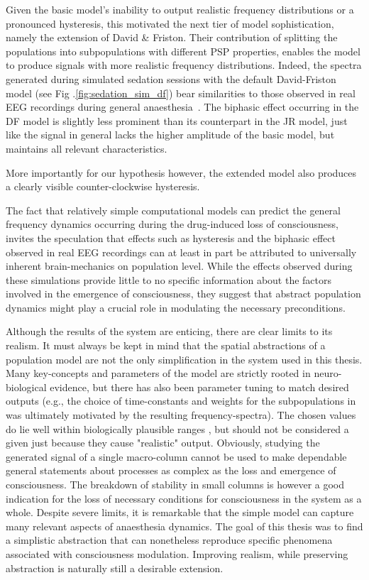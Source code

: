 Given the basic model's inability to output realistic frequency distributions or a pronounced hysteresis,
this motivated the next tier of model sophistication, namely the extension of David \&
Friston\cite{david_neural_2003}.
Their contribution of splitting the populations into subpopulations with different PSP properties,
enables the model to produce signals with more realistic frequency distributions.
Indeed, the spectra generated during simulated sedation sessions with the default David-Friston model
(see Fig .\ref{fig:sedation_sim_df}) bear similarities to those observed in
real EEG recordings during general anaesthesia~\cite{purdon_electroencephalogram_2013}.
The biphasic effect occurring in the DF model is slightly less prominent than its counterpart in the JR model,
just like the signal in general lacks the higher amplitude of the basic model,
but maintains all relevant characteristics.

More importantly for our hypothesis however,
the extended model also produces a clearly visible counter-clockwise hysteresis.

The fact that relatively simple computational models can predict the general frequency dynamics occurring during the
drug-induced loss of consciousness,
invites the speculation that effects such as hysteresis and the biphasic effect observed in real EEG recordings can at
least in part be attributed to universally inherent brain-mechanics on population level.
While the effects observed during these simulations provide little to no specific information about the factors
involved in the emergence of consciousness,
they suggest that abstract population dynamics might play a crucial role in modulating the necessary preconditions.

Although the results of the system are enticing,
there are clear limits to its realism.
It must always be kept in mind that the spatial abstractions of a
population model are not the only simplification in the system used in this thesis.
Many key-concepts and parameters of the model are strictly rooted in neuro-biological evidence,
but there has also been parameter tuning to match desired outputs (e.g., the choice of time-constants and weights for
the subpopulations in~\cite{david_neural_2003} was ultimately motivated by the resulting frequency-spectra).
The chosen values do lie well within biologically plausible ranges \citationneeded,
but should not be considered a given just because they cause "realistic" output.
Obviously, studying the generated signal of a single macro-column cannot be used to make dependable
general statements about processes as complex as the loss and emergence of consciousness.
The breakdown of stability in small columns is however a good indication for the loss of necessary
conditions for consciousness in the system as a whole.
Despite severe limits,
it is remarkable that the simple model can capture many relevant aspects of anaesthesia dynamics.
The goal of this thesis was to find a simplistic abstraction that can nonetheless reproduce specific phenomena
associated with consciousness modulation.
Improving realism, while preserving abstraction is naturally still a desirable extension.

